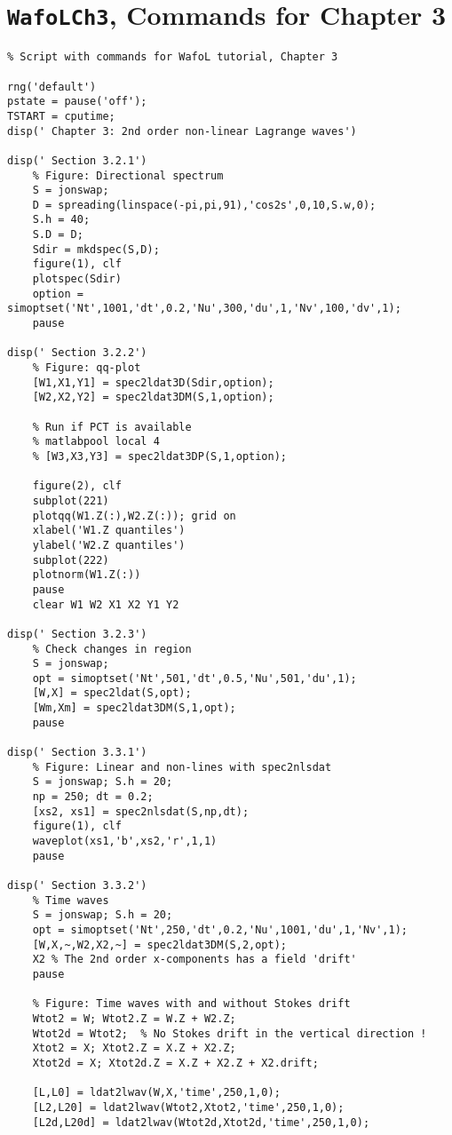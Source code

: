 \section{{\tt WafoLCh3}, Commands for Chapter 3}
{\small\begin{verbatim}
% Script with commands for WafoL tutorial, Chapter 3

rng('default')
pstate = pause('off');
TSTART = cputime;
disp(' Chapter 3: 2nd order non-linear Lagrange waves')

disp(' Section 3.2.1')
    % Figure: Directional spectrum
    S = jonswap;
    D = spreading(linspace(-pi,pi,91),'cos2s',0,10,S.w,0);
    S.h = 40; 
    S.D = D;
    Sdir = mkdspec(S,D);
    figure(1), clf
    plotspec(Sdir)
    option = simoptset('Nt',1001,'dt',0.2,'Nu',300,'du',1,'Nv',100,'dv',1);
    pause
    
disp(' Section 3.2.2')
    % Figure: qq-plot
    [W1,X1,Y1] = spec2ldat3D(Sdir,option);
    [W2,X2,Y2] = spec2ldat3DM(S,1,option);

    % Run if PCT is available
    % matlabpool local 4
    % [W3,X3,Y3] = spec2ldat3DP(S,1,option);

    figure(2), clf
    subplot(221)
    plotqq(W1.Z(:),W2.Z(:)); grid on
    xlabel('W1.Z quantiles')
    ylabel('W2.Z quantiles')
    subplot(222)
    plotnorm(W1.Z(:))
    pause
    clear W1 W2 X1 X2 Y1 Y2
    
disp(' Section 3.2.3')
    % Check changes in region
    S = jonswap;
    opt = simoptset('Nt',501,'dt',0.5,'Nu',501,'du',1);
    [W,X] = spec2ldat(S,opt);
    [Wm,Xm] = spec2ldat3DM(S,1,opt);
    pause

disp(' Section 3.3.1')
    % Figure: Linear and non-lines with spec2nlsdat
    S = jonswap; S.h = 20;
    np = 250; dt = 0.2;
    [xs2, xs1] = spec2nlsdat(S,np,dt);
    figure(1), clf
    waveplot(xs1,'b',xs2,'r',1,1)
    pause

disp(' Section 3.3.2')
    % Time waves
    S = jonswap; S.h = 20;
    opt = simoptset('Nt',250,'dt',0.2,'Nu',1001,'du',1,'Nv',1);
    [W,X,~,W2,X2,~] = spec2ldat3DM(S,2,opt);
    X2 % The 2nd order x-components has a field 'drift'
    pause
    
    % Figure: Time waves with and without Stokes drift
    Wtot2 = W; Wtot2.Z = W.Z + W2.Z;
    Wtot2d = Wtot2;  % No Stokes drift in the vertical direction ! 
    Xtot2 = X; Xtot2.Z = X.Z + X2.Z;
    Xtot2d = X; Xtot2d.Z = X.Z + X2.Z + X2.drift;

    [L,L0] = ldat2lwav(W,X,'time',250,1,0);
    [L2,L20] = ldat2lwav(Wtot2,Xtot2,'time',250,1,0);
    [L2d,L20d] = ldat2lwav(Wtot2d,Xtot2d,'time',250,1,0);


\end{verbatim}}
